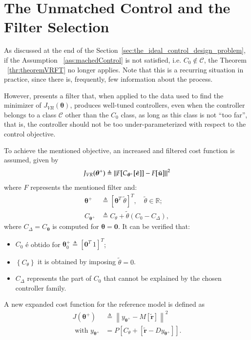\section{The Unmatched Control and the Filter Selection}%
\label{sec:filtro_caso_não_linear}
As discussed at the end of the Section~\ref{sec:the_ideal_control_design_problem}, if the Assumption ~\ref{ass:machedControl} is not satisfied, i.e. $C_0 \not\in \mathscr{C}$, the Theorem ~\ref{thr:theoremVRFT} no longer applies. Note that this is a recurring situation in practice, since there is, frequently, few information about the process.

However, \cite{campi2006} presents a filter that, when applied to the data used to find the minimizer of $J_{VR}(\bm{\theta})$, produces well-tuned controllers, even when the controller belongs to a class $\mathscr{C}$ other than the $C_0$ class, as long as this class is not ``too far'', that is, the controller should not be too under-parameterized with respect to the control objective.

To achieve the mentioned objective, an increased and filtered cost function is assumed, given by
\begin{equation}
   J_{VR}(\bm{\theta}^{+}) \triangleq \left\lVert F[C_{\bm{\theta}^{+}}[\tilde{\bm{e}}]] - F[\tilde{\bm{u}}]\right\rVert^2
\label{eq:JVRplus}
\end{equation}
where $F$ represents the mentioned filter and:
\begin{align}
   \bm{\theta}^+ &\triangleq  [\bm{\theta}^{T} \ \tilde{\theta} ]^T, \quad \tilde{\theta} \in \mathbb{R} ; \\
   C_{\bm{\theta}^+} &\triangleq C_{\theta}+\tilde{\theta}\left(C_0-C_\Delta\right),
\end{align}
where $C_\Delta=C_{\bm{\theta}}$ is computed for $\bm{\theta}=\bm{0}$. It can be verified that:
\begin{itemize}
   \setlength\itemsep{0.1pt}
   \renewcommand{\labelitemi}{--}
   \item $C_0$ é obtido for $\bm{\theta}_0^+ \triangleq [\bm{0}^T\ 1]^T$;
   \item $\left\{C_{\theta}\right\}$ it is obtained by imposing $\tilde{\theta} = 0$.
   \item $C_\Delta$ represents the part of $C_0$ that cannot be explained by the chosen controller family.
\end{itemize}

A new expanded cost function for the reference model is defined as
\begin{align}
   J\left(\bm{\theta}^+\right) &\triangleq \left\|y_{\bm{\theta}^+}-M[\tilde{\bm{r}}]\right\|^2 \\
   \text{ with } y_{\bm{\theta}^+} &=P\left[C_{\theta}+\left[\tilde{\bm{r}}-D y_{\bm{\theta}^+}\right]\right] .
\end{align}

